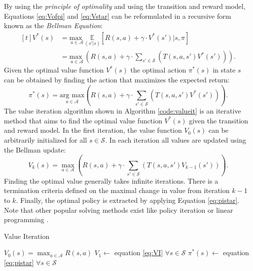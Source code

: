 By using the \textit{principle of optimality} \cite{dynprog} and using the transition and reward model, Equations \ref{eq:Vofpi} and \ref{eq:Vstar} can be reformulated in a recursive form known as the \textit{Bellman Equation}:
%
\begin{equation}\label{eq:BE}
    \begin{aligned}[t]
    V^*(s) &= \underset{a\in\mathcal{A}}{\text{max }} \underset{(s'|s)}{\mathbb{E}}\left[R(s,a) + \gamma\cdot V^*(s')|s, \pi \right]\\
    &= \underset{a\in\mathcal{A}}{\text{max }} \left(R(s,a) + \gamma\cdot \sum_{s'\in\mathcal{S}}\left(T(s,a,s')V^*(s')\right)\right).
    \end{aligned}
\end{equation}
%
Given the optimal value function $V^*(s)$ the optimal action $\pi^*(s)$ in state $s$ can be obtained by finding the action that maximizes the expected return:
\begin{equation}\label{eq:pistar}
    \pi^*(s) = \underset{a\in\mathcal{A}}{\text{arg max}}\left(R(s,a) + \gamma\cdot \sum_{s'\in\mathcal{S}}\left(T(s,a,s')V^*(s')\right)\right).
\end{equation}
The value iteration algorithm shown in Algorithm \ref{code:valueit} is an iterative method that aims to find the optimal value function $V^*(s)$ given the transition and reward model. In the first iteration, the value function $V_0(s)$ can be arbitrarily initialized for all $s\in\mathcal{S}$. In each iteration all values are updated using the Bellman update:
%
\begin{equation}\label{eq:VI}
    V_{k}(s) = \underset{a\in\mathcal{A}}{\max}  \left(R(s,a) + \gamma\cdot \sum_{s'\in\mathcal{S}}\left(T(s,a,s')V_{k-1}(s')\right)\right).
\end{equation}
%
Finding the optimal value generally takes infinite iterations. There is a termination criteria defined on the maximal change in value from iteration $k-1$ to $k$. Finally, the optimal policy is extracted by applying Equation \ref{eq:pistar}. Note that other popular solving methods exist like policy iteration or linear programming \cite{dynprog}.
%
\begin{algorithm}[htb!]
    \DontPrintSemicolon
    \caption{Value Iteration}
    \label{code:valueit}
    \Output{$\pi^*$}
         $V_0(s) = \max_{a\in\mathcal{A}} R(s,a)$    
         $V_1 \leftarrow$ equation \ref{eq:VI} $\forall s\in\mathcal{S}$ 
        $\pi^*(s) \leftarrow$ equation \ref{eq:pistar} $\forall s\in\mathcal{S}$ 
\end{algorithm}
%

